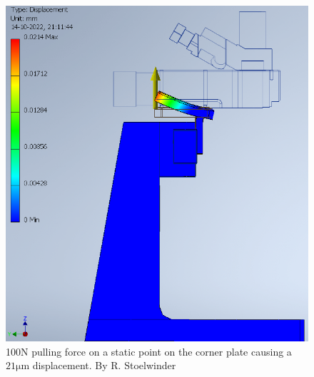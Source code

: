 \documentclass[11pt]{article}
\begin{document}
\begin{figure}[H]
  \centering
  \begin{minipage}[b]{0.45\textwidth}
    \includegraphics[width=\textwidth]{img/rigidity_simulation/study_8.png}
    \caption{100N pulling force on a static point on the corner plate causing a $21\mathrm{\mu m}$ displacement. By R. Stoelwinder}
    \label{fig:disp_study8}
  \end{minipage}
  \hfill
  \begin{minipage}[b]{0.45\textwidth}

\end{minipage}
\end{figure}
\end{document}
